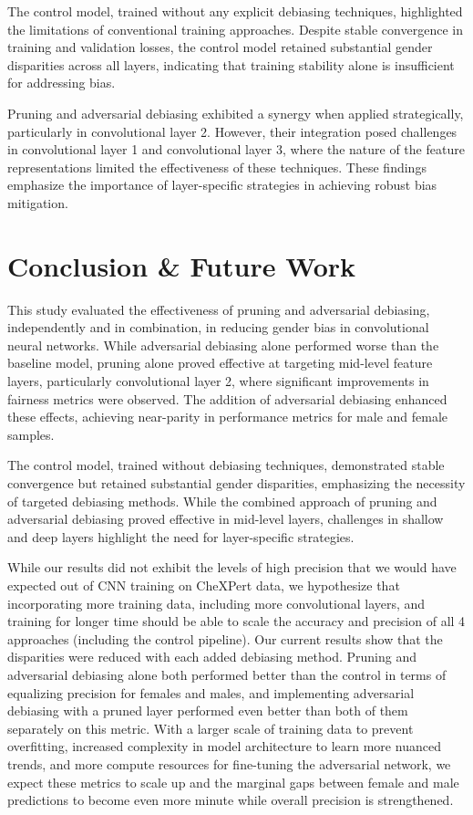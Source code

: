 \documentclass[11pt]{article}
\begin{document}
The control model, trained without any explicit debiasing techniques, highlighted the limitations of conventional training approaches. Despite stable convergence in training and validation losses, the control model retained substantial gender disparities across all layers, indicating that training stability alone is insufficient for addressing bias.

Pruning and adversarial debiasing exhibited a synergy when applied strategically, particularly in convolutional layer 2. However, their integration posed challenges in convolutional layer 1 and convolutional layer 3, where the nature of the feature representations limited the effectiveness of these techniques. These findings emphasize the importance of layer-specific strategies in achieving robust bias mitigation.


\section{Conclusion \& Future Work}

This study evaluated the effectiveness of pruning and adversarial debiasing, independently and in combination, in reducing gender bias in convolutional neural networks. While adversarial debiasing alone performed worse than the baseline model, pruning alone proved effective at targeting mid-level feature layers, particularly convolutional layer 2, where significant improvements in fairness metrics were observed. The addition of adversarial debiasing enhanced these effects, achieving near-parity in performance metrics for male and female samples.

The control model, trained without debiasing techniques, demonstrated stable convergence but retained substantial gender disparities, emphasizing the necessity of targeted debiasing methods. While the combined approach of pruning and adversarial debiasing proved effective in mid-level layers, challenges in shallow and deep layers highlight the need for layer-specific strategies.

While our results did not exhibit the levels of high precision that we would have expected out of CNN training on CheXPert data, we hypothesize that incorporating more training data, including more convolutional layers, and training for longer time should be able to scale the accuracy and precision of all 4 approaches (including the control pipeline). Our current results show that the disparities were reduced with each added debiasing method. Pruning and adversarial debiasing alone both performed better than the control in terms of equalizing precision for females and males, and implementing adversarial debiasing with a pruned layer performed even better than both of them separately on this metric. With a larger scale of training data to prevent overfitting, increased complexity in model architecture to learn more nuanced trends, and more compute resources for fine-tuning the adversarial network, we expect these metrics to scale up and the marginal gaps between female and male predictions to become even more minute while overall precision is strengthened.
\end{document}
